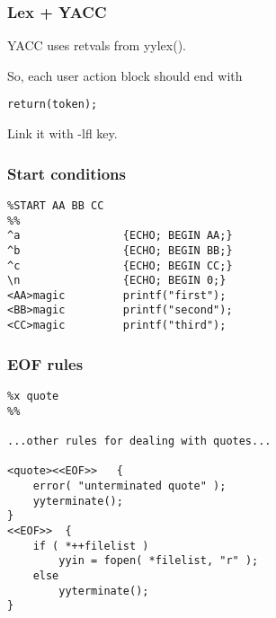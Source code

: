 \documentclass[14pt]{beamer}
\begin{document}
\begin{frame}[fragile]
	
	\frametitle{Lex + YACC}	
	
	YACC uses retvals from yylex().
	
	So, each user action block should end with
	
	\begin{lstlisting}
return(token);
	\end{lstlisting}
	
	Link it with -lfl key.
	
\end{frame}

\begin{frame}[fragile]
	
	\frametitle{Start conditions}	
	
	\begin{lstlisting}
%START AA BB CC
%%
^a                {ECHO; BEGIN AA;}
^b                {ECHO; BEGIN BB;}
^c                {ECHO; BEGIN CC;}
\n                {ECHO; BEGIN 0;}
<AA>magic         printf("first");
<BB>magic         printf("second");
<CC>magic         printf("third");
	\end{lstlisting}

\end{frame}

\begin{frame}[fragile]
	
	\frametitle{EOF rules}

\begin{small}
	\begin{lstlisting}
%x quote
%%

...other rules for dealing with quotes...

<quote><<EOF>>   {
	error( "unterminated quote" );
	yyterminate();
}
<<EOF>>  {
	if ( *++filelist )
		yyin = fopen( *filelist, "r" );
	else
		yyterminate();
}
	\end{lstlisting}
\end{small}

\end{frame}
	
\end{document}
